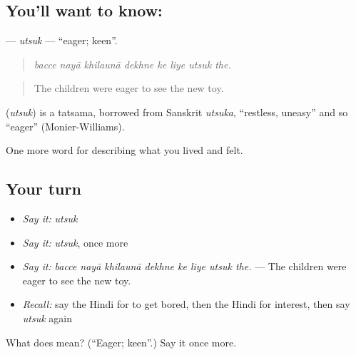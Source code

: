 \subsection*{You'll want to know: }
\textbf{} — \emph{utsuk} — \textquotedblleft{}eager; keen\textquotedblright{}.

\begin{quote}
       
\end{quote}

\begin{quote}
\emph{bacce nayā khilaunā dekhne ke liye utsuk the.}
\end{quote}

\begin{quote}
The children were eager to see the new toy.
\end{quote}

\begin{cousinweb}
\textbf{} (\emph{utsuk}) is a tatsama, borrowed from Sanskrit \emph{utsuka}, \textquotedblleft{}restless, uneasy\textquotedblright{} and so \textquotedblleft{}eager\textquotedblright{} (Monier-Williams).
\end{cousinweb}

\begin{grammarlens}[title={What you've built}]
One more word for describing what you lived and felt.
\end{grammarlens}

\subsection*{Your turn}
\begin{itemize}
\raggedright
  \item \emph{Say it:} \emph{utsuk}
  \item \emph{Say it:} \emph{utsuk}, once more
  \item \emph{Say it:} \emph{bacce nayā khilaunā dekhne ke liye utsuk the.} — The children were eager to see the new toy.
  \item \emph{Recall:} say the Hindi for to get bored, then the Hindi for interest, then say \emph{utsuk} again
\end{itemize}

\begin{tcolorbox}[breakable,colback=teal!4,colframe=teal!35!black,title={Before you move on}]
What does  mean? (\textquotedblleft{}Eager; keen\textquotedblright{}.) Say it once more.
\end{tcolorbox}
